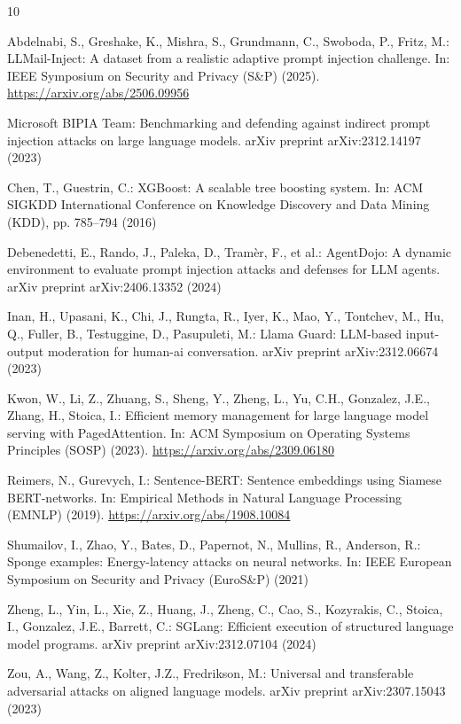 \documentclass[runningheads]{article}
\begin{document}
\begin{thebibliography}{10}

Abdelnabi, S., Greshake, K., Mishra, S., Grundmann, C., Swoboda, P., Fritz, M.:
\newblock LLMail-Inject: A dataset from a realistic adaptive prompt injection challenge.
\newblock In: IEEE Symposium on Security and Privacy (S\&P) (2025). \url{https://arxiv.org/abs/2506.09956}

Microsoft BIPIA Team:
\newblock Benchmarking and defending against indirect prompt injection attacks on large language models.
\newblock arXiv preprint arXiv:2312.14197 (2023)

Chen, T., Guestrin, C.:
\newblock XGBoost: A scalable tree boosting system.
\newblock In: ACM SIGKDD International Conference on Knowledge Discovery and Data Mining (KDD), pp. 785--794 (2016)

Debenedetti, E., Rando, J., Paleka, D., Tram{\`e}r, F., et al.:
\newblock AgentDojo: A dynamic environment to evaluate prompt injection attacks and defenses for LLM agents.
\newblock arXiv preprint arXiv:2406.13352 (2024)

Inan, H., Upasani, K., Chi, J., Rungta, R., Iyer, K., Mao, Y., Tontchev, M., Hu, Q., Fuller, B., Testuggine, D., Pasupuleti, M.:
\newblock Llama Guard: LLM-based input-output moderation for human-ai conversation.
\newblock arXiv preprint arXiv:2312.06674 (2023)

Kwon, W., Li, Z., Zhuang, S., Sheng, Y., Zheng, L., Yu, C.H., Gonzalez, J.E., Zhang, H., Stoica, I.:
\newblock Efficient memory management for large language model serving with PagedAttention.
\newblock In: ACM Symposium on Operating Systems Principles (SOSP) (2023). \url{https://arxiv.org/abs/2309.06180}

Reimers, N., Gurevych, I.:
\newblock Sentence-BERT: Sentence embeddings using Siamese BERT-networks.
\newblock In: Empirical Methods in Natural Language Processing (EMNLP) (2019). \url{https://arxiv.org/abs/1908.10084}

Shumailov, I., Zhao, Y., Bates, D., Papernot, N., Mullins, R., Anderson, R.:
\newblock Sponge examples: Energy-latency attacks on neural networks.
\newblock In: IEEE European Symposium on Security and Privacy (EuroS\&P) (2021)

Zheng, L., Yin, L., Xie, Z., Huang, J., Zheng, C., Cao, S., Kozyrakis, C., Stoica, I., Gonzalez, J.E., Barrett, C.:
\newblock SGLang: Efficient execution of structured language model programs.
\newblock arXiv preprint arXiv:2312.07104 (2024)

Zou, A., Wang, Z., Kolter, J.Z., Fredrikson, M.:
\newblock Universal and transferable adversarial attacks on aligned language models.
\newblock arXiv preprint arXiv:2307.15043 (2023)

\end{thebibliography}
\end{document}
